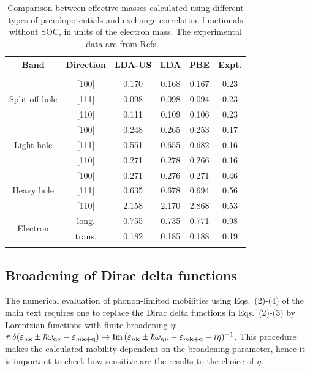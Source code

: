 \documentclass[aps,prl,twocolumn,superscriptaddress]{revtex4-1}
\begin{document}
\begin{table}
  \begin{tabular}{c c c c c c }
  \toprule
  Band & Direction       & LDA-US       & LDA          & PBE        &  Expt. \\
  \hline\\[-8pt]
  \multirow{3}{*}{Split-off hole}
  & [100]                & 0.170 & 0.168 & 0.167  &   0.23  \\
  & [111]                & 0.098 & 0.098 & 0.094  &   0.23  \\
  & [110]                & 0.111 & 0.109 & 0.106  &   0.23  \\
  \multirow{3}{*}{Light hole}
  & [100]                & 0.248 & 0.265 & 0.253  &   0.17 \\
  & [111]                & 0.551 & 0.655 & 0.682  &   0.16 \\
  & [110]                & 0.271 & 0.278 & 0.266  &   0.16 \\
  \multirow{3}{*}{Heavy hole}
  & [100]                & 0.271 & 0.276 & 0.271  &   0.46 \\
  & [111]                & 0.635 & 0.678 & 0.694  &   0.56 \\
  & [110]                & 2.158 & 2.170 & 2.868  &   0.53 \\
  \multirow{2}{*}{Electron}  
          & long.  & 0.755 & 0.735 & 0.771  &   0.98 \\ 
          & trans. & 0.182 & 0.185 & 0.188  &   0.19 \\
  \botrule 
  \end{tabular}
  \caption{\label{table2}
  Comparison between effective masses calculated using different types of pseudopotentials and exchange-correlation functionals without SOC, in units of the electron mass.
  The experimental data are from Refs.~.
  }
\end{table}




\subsection{Broadening of Dirac delta functions}
The numerical evaluation of phonon-limited mobilities using Eqs.~(2)-(4) of the main text requires one to
replace the Dirac delta functions in Eqs.~(2)-(3) by Lorentzian functions with finite broadening $\eta$: 
$\pi\,\delta({\varepsilon}_{n{\bf k}}\pm\hbar\omega_{{\bf q}\nu}-{\varepsilon}_{m{\bf k}+{\bf q}}) \rightarrow {\rm Im}\,({\varepsilon}_{n{\bf k}}\pm\hbar
\omega_{{\bf q}\nu}-{\varepsilon}_{m{\bf k}+{\bf q}}-i\eta)^{-1}$. This procedure makes the calculated mobility dependent
on the broadening parameter, hence it is important to check how sensitive are the results to the 
choice of $\eta$.
\end{document}
